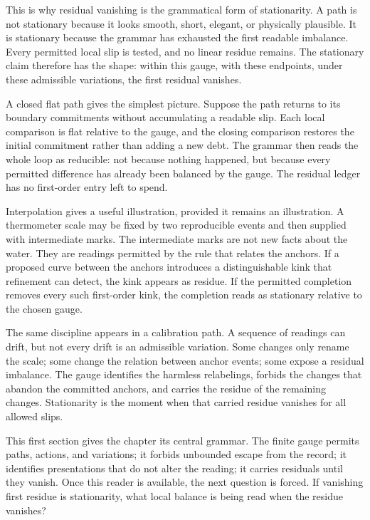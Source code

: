 This is why residual vanishing is the grammatical form of stationarity. A
path is not stationary because it looks smooth, short, elegant, or
physically plausible. It is stationary because the grammar has exhausted the
first readable imbalance. Every permitted local slip is tested, and no
linear residue remains. The stationary claim therefore has the shape:
within this gauge, with these endpoints, under these admissible variations,
the first residual vanishes.

A closed flat path gives the simplest picture. Suppose the path returns to
its boundary commitments without accumulating a readable slip. Each local
comparison is flat relative to the gauge, and the closing comparison
restores the initial commitment rather than adding a new debt. The grammar
then reads the whole loop as reducible: not because nothing happened, but
because every permitted difference has already been balanced by the
gauge. The residual ledger has no first-order entry left to spend.

Interpolation gives a useful illustration, provided it remains an
illustration. A thermometer scale may be fixed by two reproducible events
and then supplied with intermediate marks. The intermediate marks are not
new facts about the water. They are readings permitted by the rule that
relates the anchors. If a proposed curve between the anchors introduces a
distinguishable kink that refinement can detect, the kink appears as
residue. If the permitted completion removes every such first-order kink,
the completion reads as stationary relative to the chosen gauge.

The same discipline appears in a calibration path. A sequence of readings
can drift, but not every drift is an admissible variation. Some changes
only rename the scale; some change the relation between anchor events; some
expose a residual imbalance. The gauge identifies the harmless relabelings,
forbids the changes that abandon the committed anchors, and carries the
residue of the remaining changes. Stationarity is the moment when that
carried residue vanishes for all allowed slips.

This first section gives the chapter its central grammar. The finite gauge
permits paths, actions, and variations; it forbids unbounded escape from
the record; it identifies presentations that do not alter the reading; it
carries residuals until they vanish. Once this reader is available, the
next question is forced. If vanishing first residue is stationarity, what
local balance is being read when the residue vanishes?
